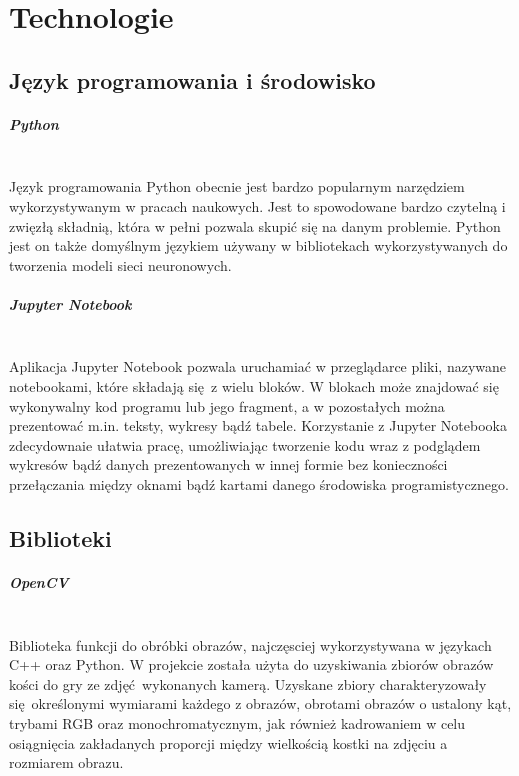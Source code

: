 
\chapter{Technologie}
\section{Język programowania i środowisko}

\paragraph{Python} \mbox{}\\
Język programowania Python obecnie jest bardzo popularnym narzędziem wykorzystywanym
w pracach naukowych. Jest to spowodowane bardzo czytelną i zwięzłą składnią,
która w pełni pozwala skupić się na danym problemie. Python jest on także domyślnym
językiem używany w bibliotekach wykorzystywanych do tworzenia modeli sieci neuronowych.

\paragraph{Jupyter Notebook} \mbox{}\\
Aplikacja Jupyter Notebook pozwala uruchamiać w przeglądarce pliki, nazywane notebookami,
które składają się z wielu bloków. W blokach może znajdować się wykonywalny kod programu
lub jego fragment, a w pozostałych można prezentować m.in. teksty, wykresy bądź tabele.
Korzystanie z Jupyter Notebooka zdecydownaie ułatwia pracę, umożliwiając tworzenie
kodu wraz z podglądem wykresów bądź danych prezentowanych w innej formie bez
konieczności przełączania między oknami bądź kartami danego środowiska programistycznego.

\section{Biblioteki}

\paragraph{OpenCV} \mbox{}\\
Biblioteka funkcji do obróbki obrazów, najczęsciej wykorzystywana w językach C++
oraz Python. W projekcie została użyta do uzyskiwania zbiorów obrazów kości do gry
ze zdjęć wykonanych kamerą. Uzyskane zbiory charakteryzowały się określonymi
wymiarami każdego z obrazów, obrotami obrazów o ustalony kąt, trybami RGB
oraz monochromatycznym, jak również kadrowaniem w celu osiągnięcia zakładanych
proporcji między wielkością kostki na zdjęciu a rozmiarem obrazu.

